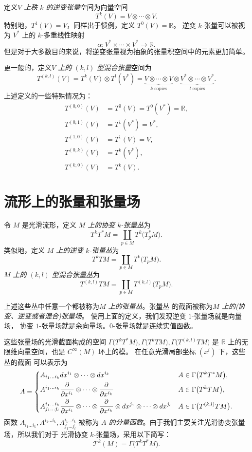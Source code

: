 \documentclass[fontset=none]{Notes}
\begin{document}
定义\emph{$V$ 上秩 $k$ 的逆变张量}空间为向量空间
\[
  T^k(V)=V\otimes \cdots\otimes V.  
\]
特别地，$T^1(V)=V$，同样出于惯例，定义 $T^0(V)=\mathbb{R}$。
逆变 $k$-张量可以被视为 $V^*$ 上的 $k$-多重线性映射
\[
  \alpha:V^*\times \cdots\times V^*\to \mathbb{R} . 
\]
但是对于大多数目的来说，将逆变张量视为抽象的张量积空间中的元素更加简单。

更一般的，定义\emph{$V$ 上的 $(k,l)$ 型混合张量}空间为
\[
  T^{(k,l)}(V)=T^k(V)\otimes T^l(V^*)=\underbrace{V\otimes\cdots\otimes V}_{\text{$k$ copies}}  
  \otimes \underbrace{V^*\otimes\cdots\otimes V^*}_{\text{$l$ copies}}.
\]
上述定义的一些特殊情况为：
\begin{align*}
  T^{(0,0)}(V)&=T^0(V)=T^0(V^*)=\mathbb{R},\\
  T^{(0,1)}(V)&=T^1(V^*)=V^*,\\
  T^{(1,0)}(V)&=T^1(V)=V,\\
  T^{(0,k)}(V)&=T^k(V^*),\\
  T^{(k,0)}(V)&=T^k(V).
\end{align*}




\section{流形上的张量和张量场}

令 $M$ 是光滑流形，定义 \emph{$M$ 上的协变 $k$-张量丛}为
\[
  T^kT^*M=\coprod_{p\in M}T^k\bigl(T_p^*M\bigr).  
\] 
类似地，定义 \emph{$M$ 上的逆变 $k$-张量丛}为
\[
  T^kTM=\coprod_{p\in M}T^k\bigl(T_pM\bigr)  .
\]
\emph{$M$ 上的 $(k,l)$ 型混合张量丛}为
\[
  T^{(k,l)}TM=\coprod_{p\in M}  T^{(k,l)}\bigl(T_pM\bigr).
\]

上述这些丛中任意一个都被称为\emph{$M$ 上的张量丛}。张量丛
的截面被称为\emph{$M$ 上的(协变、逆变或者混合)张量场}。
使用上面的定义，我们发现逆变 $1$-张量场就是向量场，
协变 $1$-张量场就是余向量场。$0$-张量场就是连续实值函数。

这些张量场的光滑截面构成的空间 
$\Gamma\bigl(T^kT^*M\bigr),\Gamma\bigl(T^kTM\bigr),\Gamma\bigl(T^{(k,l)}TM\bigr)$
是 $\mathbb{R}$ 上的无限维向量空间，也是 $C^\infty(M)$ 环上的模。
在任意光滑局部坐标 $\left(x^i\right)$ 下，这些丛的截面
可以表示为
\[
  A=\begin{dcases}
    A_{i_1\dots i_k}dx^{i_1}\otimes\cdots\otimes dx^{i_k} & A\in \Gamma\bigl(T^kT^*M\bigr),\\
    A^{i_1\dots i_k}\frac{\partial}{\partial x^{i_1}}\otimes
    \cdots\otimes \frac{\partial}{\partial x^{i_k}} & A\in \Gamma\bigl(T^kTM\bigr),\\
    A_{j_1\dots j_l}^{i_1\dots i_k}\frac{\partial}{\partial x^{i_1}}\otimes
    \cdots\otimes \frac{\partial}{\partial x^{i_k}}\otimes
    dx^{j_1}\otimes\cdots\otimes dx^{j_l} & A\in \Gamma\bigl(T^{(k,l)}TM\bigr).
  \end{dcases}  
\]
函数 $A_{i_1\dots i_k},A^{i_1\dots i_k},A_{j_1\dots j_l}^{i_1\dots i_k}$ 被称为
\emph{$A$ 的分量函数}。由于我们主要关注光滑协变张量场，所以我们对于
光滑协变 $k$-张量场，采用以下简写：
\[
  \mathcal{T}^k(M)=\Gamma\bigl(T^kT^*M\bigr)  .
\]
\end{document}

